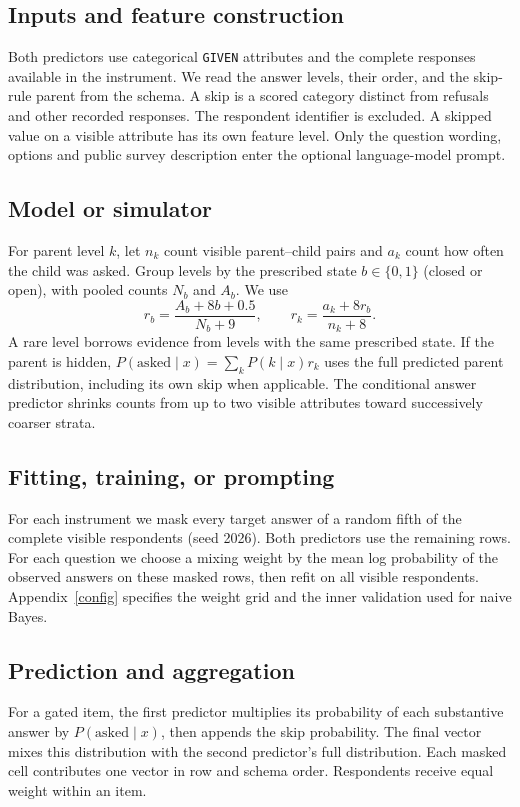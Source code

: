 \documentclass{article}
\begin{document}
\subsection{Inputs and feature construction}
Both predictors use categorical \texttt{GIVEN} attributes and the complete
responses available in the instrument. We read the answer levels, their order,
and the skip-rule parent from the schema. A skip is a scored category distinct
from refusals and other recorded responses. The respondent identifier is
excluded. A skipped value on a visible attribute has its own feature level.
Only the question wording, options and public survey description
enter the optional language-model prompt.

\newpage
\subsection{Model or simulator}
For parent level $k$, let $n_k$ count visible parent--child pairs and $a_k$
count how often the child was asked. Group levels by the prescribed state
$b\in\{0,1\}$ (closed or open), with pooled counts $N_b$ and $A_b$. We use
\[
 r_b=\frac{A_b+8b+0.5}{N_b+9},\qquad r_k=\frac{a_k+8r_b}{n_k+8}.
\]
A rare level borrows evidence from levels with the same prescribed state.
If the parent is hidden, $P(\mathrm{asked}\mid x)=\sum_k P(k\mid x)r_k$ uses
the full predicted parent distribution, including its own skip when applicable.
The conditional answer predictor shrinks counts from up to two visible
attributes toward successively coarser strata.

\subsection{Fitting, training, or prompting}
For each instrument we mask every target answer of a random fifth of the
complete visible respondents (seed 2026). Both predictors use the remaining
rows. For each question we choose a mixing weight by the mean log probability
of the observed answers on these masked rows, then refit on all visible
respondents. Appendix~\ref{config} specifies the weight grid and the inner
validation used for naive Bayes.

\subsection{Prediction and aggregation}
For a gated item, the first predictor multiplies its probability of each
substantive answer by $P(\mathrm{asked}\mid x)$, then appends the skip
probability. The final vector mixes this distribution with the second
predictor's full distribution. Each masked cell contributes one vector in row
and schema order. Respondents receive equal weight within an item.
\end{document}
